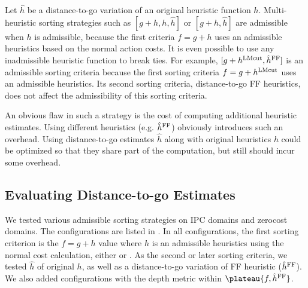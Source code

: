 Let $\hat{h}$ be a distance-to-go variation of an original heuristic function $h$.
Multi-heuristic sorting strategies such as $[g+h,h,\hat{h}]$ or $[g+h,\hat{h}]$
are admissible when $h$ is admissible, because the first criteria $f=g+h$ uses
an admissible heuristics based on the normal action costs.
It is even possible to use any inadmissible heuristic function to break
ties. For example, $[g+h^{\text{LMcut}},\hat{h}^{\text{FF}}]$ is an admissible sorting criteria
because the first sorting criteria $f=g+h^{\text{LMcut}}$ uses an admissible
\lmcut heuristics. Its second sorting criteria, distance-to-go FF
heuristics, does not affect the admissibility of this sorting criteria.

An obvious flaw in such a strategy is the cost of computing additional
heuristic estimates. Using different heuristics (e.g. $\hat{h}^{\text{FF}}$) obviously introduces such an
overhead. Using distance-to-go estimates $\hat{h}$ along with
original heuristics $h$ could be optimized so that they share part of
the computation, but still should incur some overhead.

\subsection{Evaluating Distance-to-go Estimates}

We tested various admissible sorting strategies on IPC domains and zerocost domains.
The configurations are listed in . 
In all configurations, the first sorting criterion is the $f=g+h$ value
where $h$ is an admissible heuristics using the normal cost calculation, either \lmcut or \mands.
As the second or later sorting criteria,
we tested $\hat{h}$ of original $h$, as well as a distance-to-go variation of FF
heuristic ($\hat{h}^{\text{FF}}$).
We also added configurations with the depth metric within
$\plateau{f,\hat{h}^{\text{\ff}}}$.


